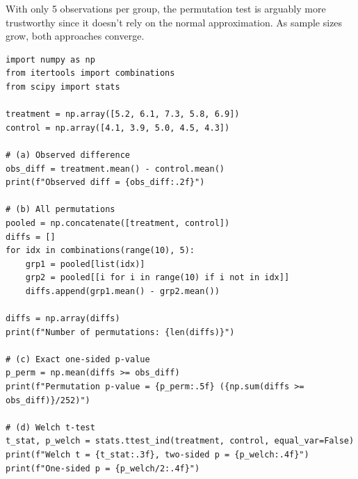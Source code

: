 \documentclass[11pt]{article}
\begin{document}
With only 5 observations per group, the permutation test is arguably more trustworthy since it doesn't rely on the normal approximation. As sample sizes grow, both approaches converge.

\begin{lstlisting}[style=python]
import numpy as np
from itertools import combinations
from scipy import stats

treatment = np.array([5.2, 6.1, 7.3, 5.8, 6.9])
control = np.array([4.1, 3.9, 5.0, 4.5, 4.3])

# (a) Observed difference
obs_diff = treatment.mean() - control.mean()
print(f"Observed diff = {obs_diff:.2f}")

# (b) All permutations
pooled = np.concatenate([treatment, control])
diffs = []
for idx in combinations(range(10), 5):
    grp1 = pooled[list(idx)]
    grp2 = pooled[[i for i in range(10) if i not in idx]]
    diffs.append(grp1.mean() - grp2.mean())

diffs = np.array(diffs)
print(f"Number of permutations: {len(diffs)}")

# (c) Exact one-sided p-value
p_perm = np.mean(diffs >= obs_diff)
print(f"Permutation p-value = {p_perm:.5f} ({np.sum(diffs >= obs_diff)}/252)")

# (d) Welch t-test
t_stat, p_welch = stats.ttest_ind(treatment, control, equal_var=False)
print(f"Welch t = {t_stat:.3f}, two-sided p = {p_welch:.4f}")
print(f"One-sided p = {p_welch/2:.4f}")
\end{lstlisting}
\end{document}
